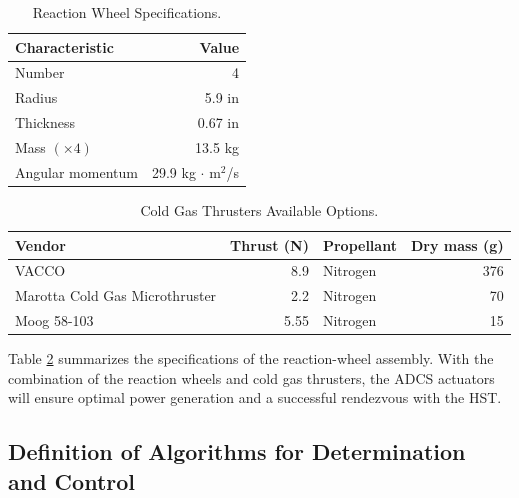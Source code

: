 \documentclass[paper=letter, fontsize=11pt]{scrartcl} %
\numberwithin{equation}{section} %
\numberwithin{figure}{section} %
\numberwithin{table}{section} %
\begin{document}
\begin{table}[H]
    \centering
    \begin{tabular}{l r}
        \toprule
        Characteristic    & Value                                                \\
        \midrule
        Number            & 4                                                    \\
        Radius            & 5.9 in                                               \\
        Thickness         & 0.67 in                                              \\
        Mass $(\times 4)$ & 13.5 kg                                              \\
        Angular momentum  & 29.9 \textup{kg} $\cdot$ \textup{m}$^{2}$\textup{/s} \\
        \bottomrule
    \end{tabular}
    \caption{Reaction Wheel Specifications.}
    \label{table:actspecs}
\end{table}

\begin{table}[H]
    \centering
    \begin{tabular}{l r l r}
        \toprule
        Vendor                         & Thrust (N) & Propellant & Dry mass (g) \\
        \midrule
        VACCO                          & 8.9        & Nitrogen   & 376          \\
        Marotta Cold Gas Microthruster & 2.2        & Nitrogen   & 70           \\
        Moog 58-103                    & 5.55       & Nitrogen   & 15           \\
        \bottomrule
    \end{tabular}
    \caption{Cold Gas Thrusters Available Options.}
    \label{table:actspecs}
\end{table}

Table \ref{table:actspecs} summarizes the specifications of the reaction-wheel assembly. With the combination of the reaction wheels and cold gas thrusters, the ADCS actuators will ensure optimal power generation and a successful rendezvous with the HST.

\subsection{Definition of Algorithms for Determination and Control}
\end{document}
